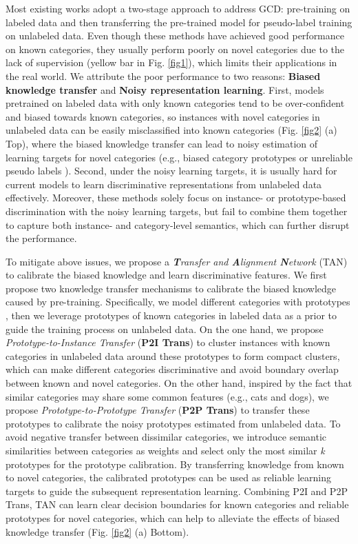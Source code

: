 \documentclass[letterpaper]{article} %
\begin{document}
Most existing works \citep{pretrain,dpn,diffusion} adopt a two-stage approach to address GCD: pre-training on labeled data and then transferring the pre-trained model for pseudo-label training on unlabeled data. Even though these methods have achieved good performance on known categories, they usually perform poorly on novel categories due to the lack of supervision (yellow bar in Fig. \ref{fig1}), which limits their applications in the real world. 
We attribute the poor performance to two reasons: \textbf{Biased knowledge transfer} and \textbf{Noisy representation learning}. 
First, models pretrained on labeled data with only known categories tend to be over-confident and biased towards known categories, so instances with novel categories in unlabeled data can be easily misclassified into known categories (Fig. \ref{fig2} (a) Top), where the biased knowledge transfer can lead to noisy estimation of learning targets for novel categories (e.g., biased category prototypes \citep{dpn} or unreliable pseudo labels \citep{thu2021}). 
Second, under the noisy learning targets, it is usually hard for current models to learn discriminative representations from unlabeled data effectively. Moreover, these methods solely focus on instance- \citep{gcd} or prototype-based discrimination \citep{dpn} with the noisy learning targets, but fail to combine them together to capture both instance- and category-level semantics, which can further disrupt the performance.


To mitigate above issues, we propose a \textit{\textbf{T}ransfer and \textbf{A}lignment \textbf{N}etwork} (TAN) to calibrate the biased knowledge and learn discriminative features. 
We first propose two knowledge transfer mechanisms to calibrate the biased knowledge caused by pre-training.
Specifically, we model different categories with prototypes \citep{proto}, then we leverage prototypes of known categories in labeled data as a prior to guide the training process on unlabeled data. 
On the one hand, we propose \textit{Prototype-to-Instance Transfer} (\textbf{P2I Trans}) to cluster instances with known categories in unlabeled data around these prototypes to form compact clusters, which can make different categories discriminative and avoid boundary overlap between known and novel categories. 
On the other hand, inspired by the fact that similar categories may share some common features (e.g., cats and dogs), we propose \textit{Prototype-to-Prototype Transfer} (\textbf{P2P Trans}) to transfer these prototypes to calibrate the noisy prototypes estimated from unlabeled data. To avoid negative transfer between dissimilar categories, we introduce semantic similarities between categories as weights and select only the most similar \textit{k} prototypes for the prototype calibration. By transferring knowledge from known to novel categories, the calibrated prototypes can be used as reliable learning targets to guide the subsequent representation learning.
Combining P2I and P2P Trans, TAN can learn clear decision boundaries for known categories and reliable prototypes for novel categories, which can help to alleviate the effects of biased knowledge transfer (Fig. \ref{fig2} (a) Bottom).
\end{document}
